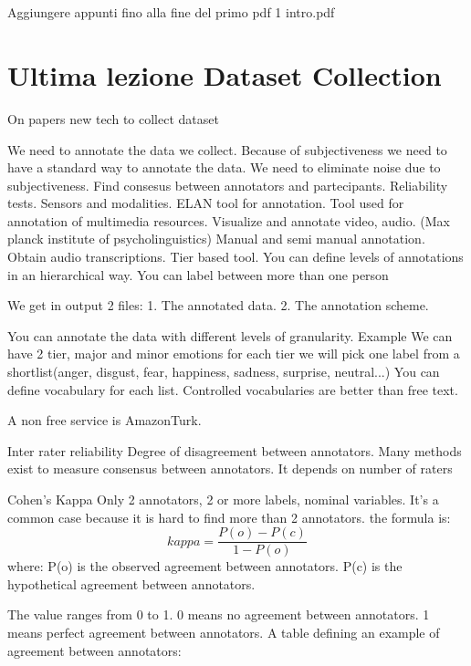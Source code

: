 \documentclass[11pt,a4paper]{article}
\theoremstyle{definition}
\theoremstyle{plain}
\theoremstyle{remark}
\begin{document}
\newpage

\section{}

Aggiungere appunti fino alla fine del primo pdf 1 intro.pdf




\section{Ultima lezione Dataset Collection}

On papers new tech to collect dataset

We need to annotate the data we collect.
Because of subjectiveness we need to have a standard way to annotate the data.
We need to eliminate noise due to subjectiveness.
Find consesus between annotators and partecipants.
Reliability tests.
Sensors and modalities.
ELAN tool for annotation.
Tool used for annotation of multimedia resources.
Visualize and annotate video, audio. (Max planck institute of psycholinguistics)
Manual and semi manual annotation.
Obtain audio transcriptions.
Tier based tool. You can define levels of annotations in an hierarchical way.
You can label between more than one person

We get in output 2 files:
1. The annotated data.
2. The annotation scheme.

You can annotate the data with different levels of granularity.
Example
We can have 2 tier, major and minor emotions
for each tier we will pick one label from a shortlist(anger, disgust, fear, happiness, sadness, surprise, neutral...)
You can define vocabulary for each list.
Controlled vocabularies are better than free text.

A non free service is AmazonTurk.


Inter rater reliability 
Degree of disagreement between annotators.
Many methods exist to measure consensus between annotators.
It depends on number of raters

Cohen's Kappa
Only 2 annotators, 2 or more labels, nominal variables.
It's a common case because it is hard to find more than 2 annotators.
the formula is:
\[kappa = \frac{P(o) - P(c)}{1 - P(o)}\]
where:
P(o) is the observed agreement between annotators.
P(c) is the hypothetical agreement between annotators.

The value ranges from 0 to 1.
0 means no agreement between annotators.
1 means perfect agreement between annotators.
A table defining an example of agreement between annotators:
\end{document}
